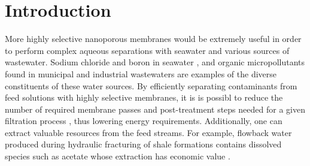\documentclass[journal=jpcbfk,manuscript=article]{achemso}
\begin{document}
  \section{Introduction}
  

  


  More highly selective nanoporous membranes would be extremely useful in order
  to perform complex aqueous separations with seawater and various sources of
  wastewater. Sodium chloride and boron in seawater
  \cite{fritzmann_state---art_2007}, and organic micropollutants found in
  municipal and industrial wastewaters \cite{schwarzenbach_challenge_2006} are
  examples of the diverse constituents of these water sources. By efficiently
  separating contaminants from feed solutions with highly selective membranes,
  it is is possibl to reduce the number of required membrane passes and post-treatment steps
  needed for a given filtration process \cite{werber_materials_2016}, thus
  lowering energy requirements. Additionally, one can extract valuable resources
  from the feed streams. For example, flowback water produced during hydraulic
  fracturing of shale formations contains dissolved species such as acetate whose
  extraction has economic value \cite{dischinger_application_2017}.  

\end{document}
